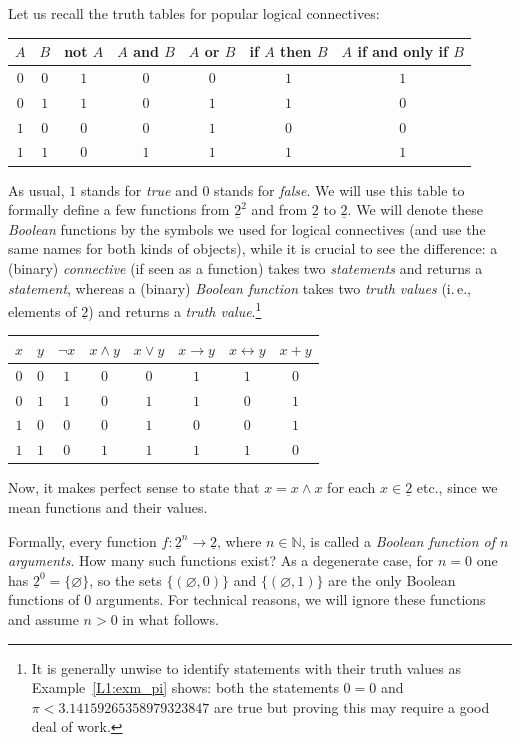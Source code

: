 \documentclass[12pt,notitlepage]{article}
\theoremstyle{plain}
\theoremstyle{definition}
\theoremstyle{plain}
\newcommand{\N}{\mathbb{N}}
\newcommand{\void}{\varnothing}
\newcommand{\ul}[1]{\underline{#1}}
\newcommand{\1}{\mathbf{1}}
\newcommand{\0}{\mathbf{0}}
\begin{document}
Let us recall the truth tables for popular logical connectives:
\begin{center}
\begin{tabular}{| c c | c | c | c | c | c |}
\hline
$A$ & $B$ & not $A$  &$A$ and $B$&$A$ or $B$&if $A$ then $B$ &$A$ if and only if $B$\\
\hline
$0$&$0$&$1$&$0$&$0$&$1$&$1$\\
$0$&$1$&$1$&$0$&$1$&$1$&$0$\\
$1$&$0$&$0$&$0$&$1$&$0$&$0$\\
$1$&$1$&$0$&$1$&$1$&$1$&$1$\\
\hline
\end{tabular}
\end{center}
As usual, $1$ stands for \emph{true} and $0$ stands for \emph{false}. We will use this table to formally define a few functions from $\ul{2}^2$ and from $\ul{2}$ to $\ul{2}$. We will denote these \emph{Boolean} functions by the symbols we used for logical connectives (and use the same names for both kinds of objects), while it is crucial to see the difference: a (binary) \emph{connective} (if seen as a function) takes two \emph{statements} and returns a \emph{statement}, whereas a (binary) \emph{Boolean function} takes two \emph{truth values} (i.\,e., elements of $\ul{2}$) and returns a \emph{truth value}.\footnote{It is generally unwise to identify statements with their truth values as Example~\ref{L1:exm_pi} shows: both the statements $0 = 0$ and $\pi < 3.14159265358979323847$ are true but proving this may require a good deal of work.} 
\begin{center}
\begin{tabular}{| c c | c | c | c | c | c | c |}
\hline
$x$ & $y$ & $\neg x$  &$x \wedge y$&$x \vee y$&$x \to y$ &$x \leftrightarrow y$&$x + y$\\
\hline
$0$&$0$&$1$&$0$&$0$&$1$&$1$&$0$\\
$0$&$1$&$1$&$0$&$1$&$1$&$0$&$1$\\
$1$&$0$&$0$&$0$&$1$&$0$&$0$&$1$\\
$1$&$1$&$0$&$1$&$1$&$1$&$1$&$0$\\
\hline
\end{tabular}
\end{center}
Now, it makes perfect sense to state that $x = x \wedge x$ for each $x \in \ul{2}$ etc., since we mean functions and their values.

Formally, every function $f\colon \ul{2}^n \to \ul{2}$, where $n \in \N$, is called a \emph{Boolean function of $n$ arguments}. How many such functions exist? As a degenerate case, for $n = 0$ one has $\ul{2}^0 = \{ \void \}$, so the sets $\{ (\void, 0) \}$ and $\{ (\void, 1) \}$ are the only Boolean functions of $0$ arguments. For technical reasons, we will ignore these functions and assume $n > 0$ in what follows.
\end{document}
